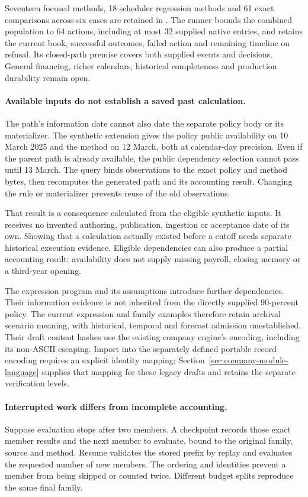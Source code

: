 Seventeen focused methods, 18 scheduler regression methods and 61 exact
comparisons across six cases are retained in
. The runner bounds
the combined population to 64 actions, including at most 32 supplied native
entries, and retains the current book, successful outcomes, failed action and
remaining timeline on refusal. Its closed-path premise covers both supplied
events and decisions. General financing, richer calendars, historical
completeness and production durability remain open.


\paragraph{Available inputs do not establish a saved past calculation.}
The path's information date cannot also date the separate policy body or its
materializer. The synthetic extension gives the policy public availability on
10 March 2025 and the method on 12 March, both at calendar-day precision.
Even if the parent path is already available, the public dependency selection
cannot pass until 13 March. The query binds observations to the exact policy
and method bytes, then recomputes the generated path and its accounting result.
Changing the rule or materializer prevents reuse of the old observations.

That result is a consequence calculated from the eligible synthetic inputs.
It receives no invented authoring, publication, ingestion or acceptance date
of its own. Showing that a calculation actually existed before a cutoff needs
separate historical execution evidence. Eligible dependencies can also produce
a partial accounting result: availability does not supply missing payroll,
closing memory or a third-year opening.

The expression program and its assumptions introduce further dependencies.
Their information evidence is not inherited from the directly supplied
90-percent policy. The current expression and family examples therefore retain
archival scenario meaning, with historical, temporal and forecast admission
unestablished. Their draft content hashes use the existing company engine's
encoding, including its non-ASCII escaping. Import into the separately defined
portable record encoding requires an explicit identity mapping;
Section~\ref{sec:company-module-language} supplies that mapping for these
legacy drafts and retains the separate verification levels.

\paragraph{Interrupted work differs from incomplete accounting.}
Suppose evaluation stops after two members. A checkpoint records those exact
member results and the next member to evaluate, bound to the original family,
source and method. Resume validates the stored prefix by replay and evaluates
the requested number of new members. The ordering and identities prevent a
member from being skipped or counted twice. Different budget splits reproduce
the same final family.

